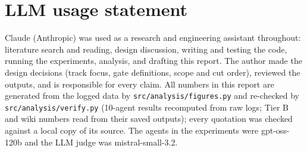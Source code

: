 \section*{LLM usage statement}
Claude (Anthropic) was used as a research and engineering assistant throughout: literature search and reading, design discussion, writing and testing the code, running the experiments, analysis, and drafting this report. The author made the design decisions (track focus, gate definitions, scope and cut order), reviewed the outputs, and is responsible for every claim. All numbers in this report are generated from the logged data by \texttt{src/analysis/figures.py} and re-checked by \texttt{src/analysis/verify.py} (10-agent results recomputed from raw logs; Tier B and wiki numbers read from their saved outputs); every quotation was checked against a local copy of its source. The agents in the experiments were gpt-oss-120b and the LLM judge was mistral-small-3.2.
